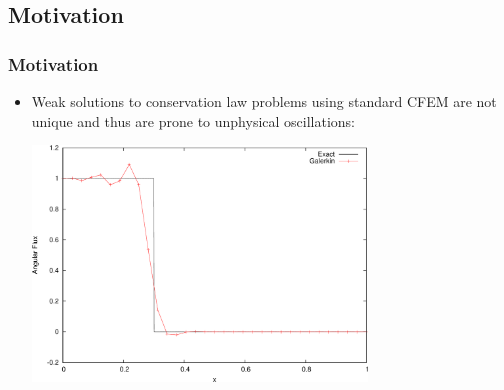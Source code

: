 \documentclass{beamer}
\begin{document}
\subsection{Motivation}
\begin{frame}
\frametitle{Motivation}

\begin{itemize}
   \item Weak solutions to conservation law problems using standard CFEM
      are not unique and thus are prone to unphysical oscillations:
   \begin{center}
      \includegraphics[width=0.7\textwidth]{./figures/advection_Galerkin.pdf}
   \end{center}
\end{itemize}

\end{frame}
\end{document}
